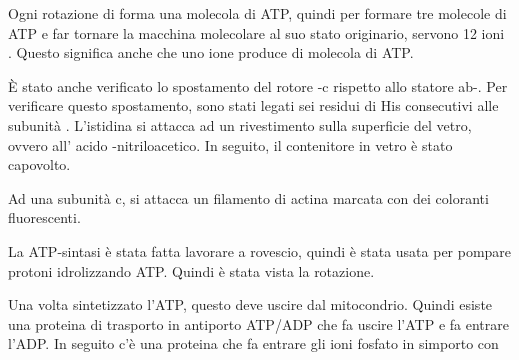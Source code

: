 Ogni rotazione di \gamma{} forma una molecola di ATP, quindi per formare tre molecole di ATP e far tornare la macchina molecolare al suo stato originario, servono 12 ioni . Questo significa anche che uno ione  produce  di molecola di ATP.{}


È stato anche verificato lo spostamento del rotore \gamma\epsilon-c rispetto allo statore ab-\alpha{}\beta{}\delta. Per verificare questo spostamento, sono stati legati sei residui di His consecutivi alle subunità \alpha. L'istidina si attacca ad un rivestimento sulla superficie del vetro, ovvero all' acido -nitriloacetico. In seguito, il contenitore in vetro è stato capovolto.

Ad una subunità c, si attacca un filamento di actina marcata con dei coloranti fluorescenti.

La ATP-sintasi è stata fatta lavorare a rovescio, quindi è stata usata per pompare protoni idrolizzando ATP. Quindi è stata vista la rotazione.


Una volta sintetizzato l'ATP, questo deve uscire dal mitocondrio. Quindi esiste una proteina di trasporto in antiporto ATP/ADP che fa uscire l'ATP e fa entrare l'ADP.{} In seguito c'è una proteina che fa entrare gli ioni fosfato in simporto con 


